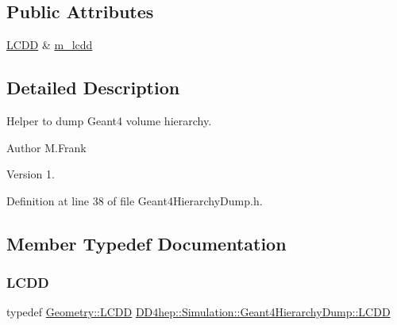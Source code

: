 \subsection*{Public Attributes}
\begin{DoxyCompactItemize}
\item 
\hyperlink{class_d_d4hep_1_1_simulation_1_1_geant4_hierarchy_dump_a4b0ebc3e2346d0ff1c40293d4610f560}{L\+C\+DD} \& \hyperlink{class_d_d4hep_1_1_simulation_1_1_geant4_hierarchy_dump_a28785ab85c2dfa536abf8050804796d7}{m\+\_\+lcdd}
\end{DoxyCompactItemize}


\subsection{Detailed Description}
Helper to dump Geant4 volume hierarchy. 

\begin{DoxyAuthor}{Author}
M.\+Frank 
\end{DoxyAuthor}
\begin{DoxyVersion}{Version}
1. 
\end{DoxyVersion}


Definition at line 38 of file Geant4\+Hierarchy\+Dump.\+h.



\subsection{Member Typedef Documentation}
\hypertarget{class_d_d4hep_1_1_simulation_1_1_geant4_hierarchy_dump_a4b0ebc3e2346d0ff1c40293d4610f560}{}\label{class_d_d4hep_1_1_simulation_1_1_geant4_hierarchy_dump_a4b0ebc3e2346d0ff1c40293d4610f560} 
\subsubsection{\texorpdfstring{L\+C\+DD}{LCDD}}
{\footnotesize\ttfamily typedef \hyperlink{class_d_d4hep_1_1_geometry_1_1_l_c_d_d}{Geometry\+::\+L\+C\+DD} \hyperlink{class_d_d4hep_1_1_simulation_1_1_geant4_hierarchy_dump_a4b0ebc3e2346d0ff1c40293d4610f560}{D\+D4hep\+::\+Simulation\+::\+Geant4\+Hierarchy\+Dump\+::\+L\+C\+DD}}



